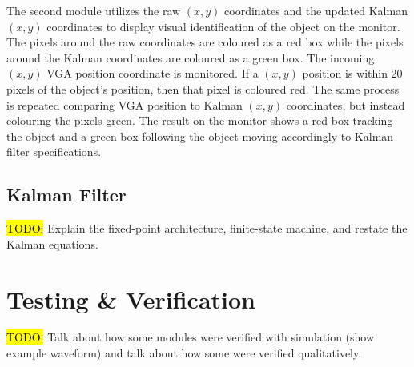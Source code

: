 \documentclass[11pt]{article} %
\begin{document}
The second module utilizes the raw $(x,y)$ coordinates and the updated Kalman $(x,y)$ coordinates to display visual identification of the object on the monitor. The pixels around the raw coordinates are coloured as a red box while the pixels around the Kalman coordinates are coloured as a green box. The incoming $(x,y)$ VGA position coordinate is monitored. If a $(x,y)$ position is within 20 pixels of the object's position, then that pixel is coloured red. The same process is repeated comparing VGA position to Kalman $(x,y)$ coordinates, but instead colouring the pixels green. The result on the monitor shows a red box tracking the object and a green box following the object moving accordingly to Kalman filter specifications. 
\subsection{Kalman Filter}
\hl{TODO:} Explain the fixed-point architecture, finite-state machine, and restate the Kalman equations.
\section{Testing \& Verification}
\hl{TODO:} Talk about how some modules were verified with simulation (show example waveform) and talk about how some were verified qualitatively.
\end{document}
